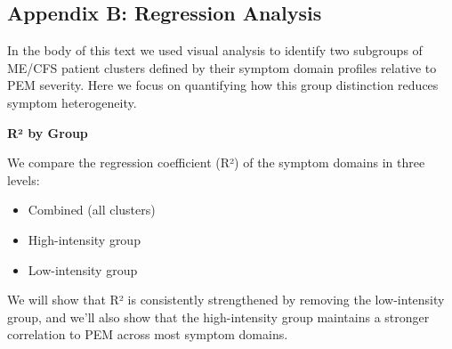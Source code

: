 \documentclass[
  letterpaper,
  DIV=11,
  numbers=noendperiod]{scrartcl}
\providecommand{\tightlist}{%
  \setlength{\itemsep}{0pt}\setlength{\parskip}{0pt}}
\begin{document}
\FloatBarrier

\subsection*{Appendix B: Regression Analysis}\label{sec-regression}

In the body of this text we used visual analysis to identify two
subgroups of ME/CFS patient clusters defined by their symptom domain
profiles relative to PEM severity. Here we focus on quantifying how this
group distinction reduces symptom heterogeneity.

\textbf{R² by Group}

We compare the regression coefficient (R²) of the symptom domains in
three levels:

\begin{itemize}
\tightlist
\item
  Combined (all clusters)
\item
  High-intensity group
\item
  Low-intensity group
\end{itemize}

We will show that R² is consistently strengthened by removing the
low-intensity group, and we'll also show that the high-intensity group
maintains a stronger correlation to PEM across most symptom domains.
\FloatBarrier

\begin{table}

\caption{\label{tbl-t2}R² by Domain}


\end{table}%
\end{document}
